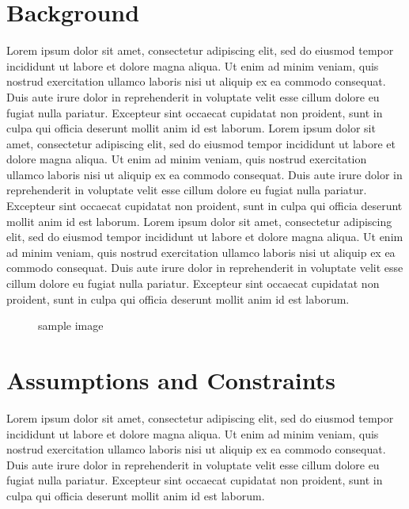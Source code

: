 \documentclass[12pt]{article}
\newcommand{\insertpic}[3][0.55]{
\begin{figure}[H]
    \centering
		\setlength{\fboxsep}{0pt}
		\setlength{\fboxrule}{1pt}
    \fbox{\texttt{[image: \#2]}}
    \caption{#3}
\end{figure}
}
\begin{document}
\section{Background}
Lorem ipsum dolor sit amet, consectetur adipiscing elit, sed do eiusmod tempor incididunt ut labore et dolore magna aliqua. Ut enim ad minim veniam, quis nostrud exercitation ullamco laboris nisi ut aliquip ex ea commodo consequat. Duis aute irure dolor in reprehenderit in voluptate velit esse cillum dolore eu fugiat nulla pariatur. Excepteur sint occaecat cupidatat non proident, sunt in culpa qui officia deserunt mollit anim id est laborum.\cite{test} Lorem ipsum dolor sit amet, consectetur adipiscing elit, sed do eiusmod tempor incididunt ut labore et dolore magna aliqua. Ut enim ad minim veniam, quis nostrud exercitation ullamco laboris nisi ut aliquip ex ea commodo consequat. Duis aute irure dolor in reprehenderit in voluptate velit esse cillum dolore eu fugiat nulla pariatur. Excepteur sint occaecat cupidatat non proident, sunt in culpa qui officia deserunt mollit anim id est laborum.\cite{test} Lorem ipsum dolor sit amet, consectetur adipiscing elit, sed do eiusmod tempor incididunt ut labore et dolore magna aliqua. Ut enim ad minim veniam, quis nostrud exercitation ullamco laboris nisi ut aliquip ex ea commodo consequat. Duis aute irure dolor in reprehenderit in voluptate velit esse cillum dolore eu fugiat nulla pariatur. Excepteur sint occaecat cupidatat non proident, sunt in culpa qui officia deserunt mollit anim id est laborum.\cite{test}

\insertpic{sample}{sample image}

\section{Assumptions and Constraints}
Lorem ipsum dolor sit amet, consectetur adipiscing elit, sed do eiusmod tempor incididunt ut labore et dolore magna aliqua. Ut enim ad minim veniam, quis nostrud exercitation ullamco laboris nisi ut aliquip ex ea commodo consequat. Duis aute irure dolor in reprehenderit in voluptate velit esse cillum dolore eu fugiat nulla pariatur. Excepteur sint occaecat cupidatat non proident, sunt in culpa qui officia deserunt mollit anim id est laborum.\cite{test} 


\printbibliography
\end{document}
